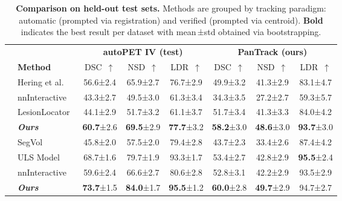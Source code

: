 \begin{table}[t]
\caption{\textbf{Comparison on held-out test sets.} Methods are grouped by tracking paradigm: automatic (prompted via registration) and verified (prompted via centroid). \textbf{Bold} indicates the best result per dataset with mean\,{\scriptsize ±std} obtained via bootstrapping.}
\label{tab:main_results}
\centering
\setlength{\tabcolsep}{3pt}
\begin{tabular}{cl ccc ccc}
\toprule
 & & \multicolumn{3}{c}{\textbf{autoPET IV (test)}} & \multicolumn{3}{c}{\textbf{PanTrack (ours)}} \\
\cmidrule(lr){3-5}\cmidrule(lr){6-8}
 & \textbf{Method} & DSC~$\uparrow$ & NSD~$\uparrow$ & LDR~$\uparrow$
                  & DSC~$\uparrow$ & NSD~$\uparrow$ & LDR~$\uparrow$ \\
\midrule
 & Hering et al.~\cite{hering2021whole}
   & 56.6{\scriptsize ±2.4} & 65.9{\scriptsize ±2.7} & 76.7{\scriptsize ±2.9}
   & 49.9{\scriptsize ±3.2} & 41.3{\scriptsize ±2.9} & 83.1{\scriptsize ±4.7} \\
 & nnInteractive~\cite{nnInteractive}
   & 43.3{\scriptsize ±2.7} & 49.5{\scriptsize ±3.0} & 61.3{\scriptsize ±3.4}
   & 34.3{\scriptsize ±3.5} & 27.2{\scriptsize ±2.7} & 59.3{\scriptsize ±5.7} \\
 & LesionLocator~\cite{Rokuss_2025_CVPR}
   & 44.1{\scriptsize ±2.9} & 51.7{\scriptsize ±3.2} & 61.1{\scriptsize ±3.7}
   & 51.7{\scriptsize ±3.4} & 41.3{\scriptsize ±3.3} & 84.0{\scriptsize ±4.2} \\
\rowcolor{gray!10}
\multirow{-4}{*}{\cellcolor{white}\rotatebox[origin=c]{90}{\shortstack{Automatic}}}
 & \textit{\textbf{Ours}}
   & \textbf{60.7}{\scriptsize ±2.6} & \textbf{69.5}{\scriptsize ±2.9} & \textbf{77.7}{\scriptsize ±3.2}
   & \textbf{58.2}{\scriptsize ±3.0} & \textbf{48.6}{\scriptsize ±3.0} & \textbf{93.7}{\scriptsize ±3.0}\\
\midrule
 & SegVol~\cite{du2024segvol}
   & 45.8{\scriptsize ±2.0} & 57.5{\scriptsize ±2.0} & 79.4{\scriptsize ±2.8}
   & 43.7{\scriptsize ±2.3} & 33.4{\scriptsize ±2.6} & 87.4{\scriptsize ±4.2} \\
 & ULS Model~\cite{uls_challenge}
   & 68.7{\scriptsize ±1.6} & 79.7{\scriptsize ±1.9} & 93.3{\scriptsize ±1.7}
   & 53.4{\scriptsize ±2.7} & 42.8{\scriptsize ±2.9} & \textbf{95.5}{\scriptsize ±2.4} \\
 & nnInteractive~\cite{nnInteractive}
   & 59.6{\scriptsize ±2.4} & 66.6{\scriptsize ±2.7} & 80.6{\scriptsize ±2.8}
   & 52.8{\scriptsize ±3.1} & 42.2{\scriptsize ±2.9} & 93.5{\scriptsize ±2.9} \\
\rowcolor{gray!10}
\multirow{-4}{*}{\cellcolor{white}\rotatebox[origin=c]{90}{\shortstack{Verified}}}
 & \textit{\textbf{Ours}}
   & \textbf{73.7}{\scriptsize ±1.5} & \textbf{84.0}{\scriptsize ±1.7} & \textbf{95.5}{\scriptsize ±1.2}
   & \textbf{60.0}{\scriptsize ±2.8} & \textbf{49.7}{\scriptsize ±2.9} & 94.7{\scriptsize ±2.7} \\
\bottomrule
\end{tabular}
\end{table}


